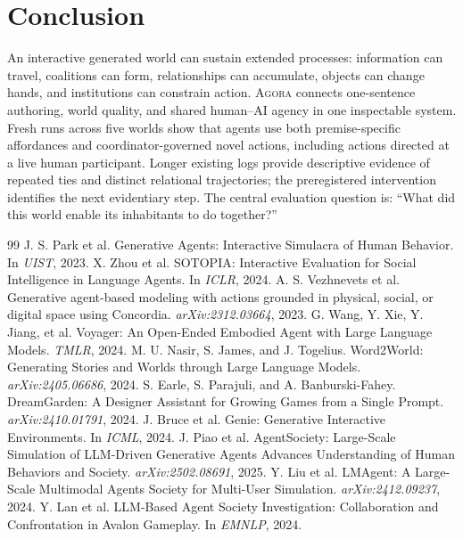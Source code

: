 \documentclass[10pt,twocolumn]{article}
\newcommand{\agora}{\textsc{Agora}\xspace}
\begin{document}
\section{Conclusion}

An interactive generated world can sustain extended processes: information can
travel, coalitions can form, relationships
can accumulate, objects can change hands, and institutions can constrain
action. \agora connects one-sentence authoring, world quality, and shared
human--AI agency in one inspectable system. Fresh runs across five worlds show
that agents use both premise-specific affordances and coordinator-governed novel
actions, including actions directed at a live human participant. Longer existing
logs provide descriptive evidence of repeated ties and distinct relational
trajectories; the preregistered intervention identifies the next evidentiary
step. The central evaluation question is: ``What did this world enable its
inhabitants to do together?''

\begin{thebibliography}{99}
 J. S. Park et al. Generative Agents: Interactive Simulacra
of Human Behavior. In \emph{UIST}, 2023.
 X. Zhou et al. SOTOPIA: Interactive Evaluation for Social
Intelligence in Language Agents. In \emph{ICLR}, 2024.
 A. S. Vezhnevets et al. Generative agent-based
modeling with actions grounded in physical, social, or digital space using
Concordia. \emph{arXiv:2312.03664}, 2023.
 G. Wang, Y. Xie, Y. Jiang, et al. Voyager: An
Open-Ended Embodied Agent with Large Language Models. \emph{TMLR}, 2024.
 M. U. Nasir, S. James, and J. Togelius. Word2World:
Generating Stories and Worlds through Large Language Models.
\emph{arXiv:2405.06686}, 2024.
 S. Earle, S. Parajuli, and A. Banburski-Fahey.
DreamGarden: A Designer Assistant for Growing Games from a Single Prompt.
\emph{arXiv:2410.01791}, 2024.
 J. Bruce et al. Genie: Generative Interactive Environments.
In \emph{ICML}, 2024.
 J. Piao et al. AgentSociety: Large-Scale Simulation of
LLM-Driven Generative Agents Advances Understanding of Human Behaviors and
Society. \emph{arXiv:2502.08691}, 2025.
 Y. Liu et al. LMAgent: A Large-Scale Multimodal Agents
Society for Multi-User Simulation. \emph{arXiv:2412.09237}, 2024.
 Y. Lan et al. LLM-Based Agent Society Investigation:
Collaboration and Confrontation in Avalon Gameplay. In \emph{EMNLP}, 2024.
\end{thebibliography}
\end{document}
